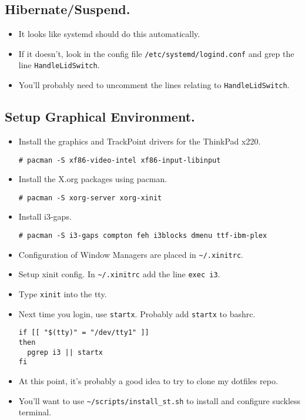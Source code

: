 \documentclass{article}
\begin{document}
  \subsection{Hibernate/Suspend.}

  \begin{itemize}
    \item It looks like systemd should do this automatically.
    \item If it doesn't, look in the config file \verb|/etc/systemd/logind.conf| and grep the line \verb|HandleLidSwitch|.
    \item You'll probably need to uncomment the lines relating to \verb|HandleLidSwitch|.
  \end{itemize}

  \subsection{Setup Graphical Environment.}

  \begin{itemize}
    \item Install the graphics and TrackPoint drivers for the ThinkPad x220.
\begin{verbatim}
# pacman -S xf86-video-intel xf86-input-libinput
\end{verbatim}
    \item Install the X.org packages using pacman.
\begin{verbatim}
# pacman -S xorg-server xorg-xinit
\end{verbatim}
    \item Install i3-gaps.
\begin{verbatim}
# pacman -S i3-gaps compton feh i3blocks dmenu ttf-ibm-plex
\end{verbatim}
    \item Configuration of Window Managers are placed in \verb|~/.xinitrc|.
    \item Setup xinit config.
      In \verb|~/.xinitrc| add the line \verb|exec i3|.
    \item Type \verb|xinit| into the tty.
    \item Next time you login, use \verb|startx|.
      Probably add \verb|startx| to bashrc.
\begin{verbatim}
if [[ "$(tty)" = "/dev/tty1" ]]
then
  pgrep i3 || startx
fi
\end{verbatim}
    \item At this point, it's probably a good idea to try to clone my dotfiles repo.
    \item You'll want to use \verb|~/scripts/install_st.sh| to install and configure suckless terminal.
  \end{itemize}
\end{document}
